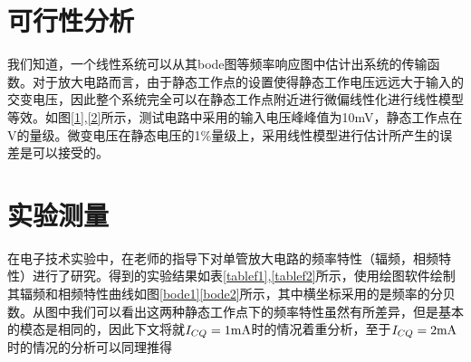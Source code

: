 \documentclass[UTF8,a4paper]{paper}
\begin{document}
\section{可行性分析}
我们知道，一个线性系统可以从其bode图等频率响应图中估计出系统的传输函数。对于放大电路而言，由于静态工作点的设置使得静态工作电压远远大于输入的交变电压，因此整个系统完全可以在静态工作点附近进行微偏线性化进行线性模型等效。如图\ref{1},\ref{2}所示，测试电路中采用的输入电压峰峰值为10mV，静态工作点在V的量级。微变电压在静态电压的1\%量级上，采用线性模型进行估计所产生的误差是可以接受的。

\section{实验测量}
在电子技术实验中，在老师的指导下对单管放大电路的频率特性（辐频，相频特性）进行了研究。得到的实验结果如表\ref{tablef1},\ref{tablef2}所示，使用绘图软件绘制其辐频和相频特性曲线如图\ref{bode1}\ref{bode2}所示，其中横坐标采用的是频率的分贝数。从图中我们可以看出这两种静态工作点下的频率特性虽然有所差异，但是基本的模态是相同的，因此下文将就$I_{CQ}=1\rm{mA}$时的情况着重分析，至于$I_{CQ}=2\rm{mA}$时的情况的分析可以同理推得
\end{document}

